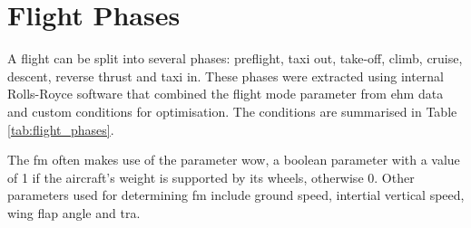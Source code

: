 \section{Flight Phases} \label{sec:phases}
A flight can be split into several phases: preflight, taxi out, take-off, climb, cruise, descent, reverse thrust and taxi in. These phases were extracted using internal Rolls-Royce software \cite[]{konig_br725stats_2018} that combined the flight mode parameter from \ac{ehm} data \cite[]{reischl_br700-725a1-12_2014} and custom conditions for optimisation. The conditions are summarised in Table \ref{tab:flight_phases}.

The \ac{fm} often makes use of the parameter \ac{wow}, a boolean parameter with a value of 1 if the aircraft's weight is supported by its wheels, otherwise 0. Other parameters used for determining \ac{fm} include ground speed, intertial vertical speed, wing flap angle and \ac{tra}.

